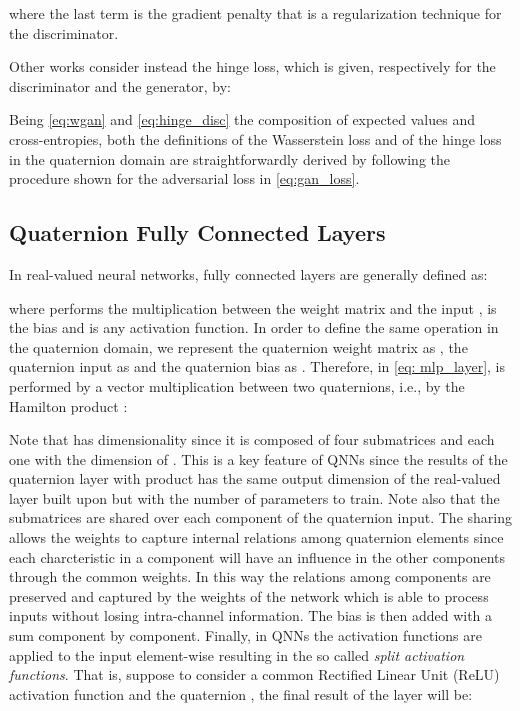 \documentclass[graybox]{svmult}
\begin{document}
\noindent where the last term is the gradient penalty that is a regularization technique for the discriminator.

Other works \cite{Miyato2018SpectralNF, Chen2019SelfSupervisedGV} consider instead the hinge loss, which is given, respectively for the discriminator and the generator, by:





Being \eqref{eq:wgan} and \eqref{eq:hinge_disc} the composition of expected values and cross-entropies, both the definitions of the Wasserstein loss and of the hinge loss in the quaternion domain are straightforwardly derived by following the procedure shown for the adversarial loss in \eqref{eq:gan_loss}.


\subsection{Quaternion Fully Connected Layers}

\noindent In real-valued neural networks, fully connected layers are generally defined as:



\noindent where  performs the multiplication between the weight matrix  and the input ,  is the bias and  is any activation function.
In order to define the same operation in the quaternion domain, we represent the  quaternion weight matrix as , the quaternion input as  and the quaternion bias as . Therefore,  in \eqref{eq: mlp_layer}, is performed by a vector multiplication between two quaternions, i.e., by the Hamilton product :



Note that  has dimensionality  since it is composed of four submatrices  and  each one with  the dimension of . This is a key feature of QNNs since the results of the quaternion layer with product  has the same output dimension of the real-valued layer built upon  but with  the number of parameters to train.
Note also that the submatrices are shared over each component of the quaternion input. The sharing allows the weights to capture internal relations among quaternion elements since each charcteristic in a component will have an influence in the other components through the common weights. In this way the relations among components are preserved and captured by the weights of the network which is able to process inputs without losing intra-channel information.
The bias  is then added with a sum component by component.
Finally, in QNNs the activation functions are applied to the input element-wise resulting in the so called \textit{split activation functions}. That is, suppose to consider a common Rectified Linear Unit (ReLU) activation function and the quaternion , the final result  of the layer will be:
\end{document}
